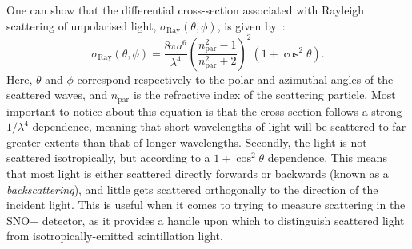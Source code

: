 One can show that the differential cross-section associated with Rayleigh scattering of unpolarised light, $\sigma_{\textrm{Ray}}\left(\theta,\phi\right)$,  is given by~\cite{}: %
\begin{equation}
    \sigma_{\textrm{Ray}}\left(\theta,\phi\right) = \frac{8\pi a^{6}}{\lambda^{4}}\left(\frac{n_{\textrm{par}}^{2}-1}{n_{\textrm{par}}^{2}+2}\right)^{2} \left(1+\cos^{2}\theta\right).
\end{equation}
Here, $\theta$ and $\phi$ correspond respectively to the polar and azimuthal angles of the scattered waves, and $n_{\mathrm{par}}$ is the refractive index of the scattering particle. Most important to notice about this equation is that the cross-section follows a strong $1/\lambda^{4}$ dependence, meaning that short wavelengths of light will be scattered to far greater extents than that of longer wavelengths. Secondly, the light is not scattered isotropically, but according to a $1+\cos^{2}\theta$ dependence. This means that most light is either scattered directly forwards or backwards (known as a \textit{backscattering}), and little gets scattered orthogonally to the direction of the incident light. This is useful when it comes to trying to measure scattering in the SNO+ detector, as it provides a handle upon which to distinguish scattered light from isotropically-emitted scintillation light.


